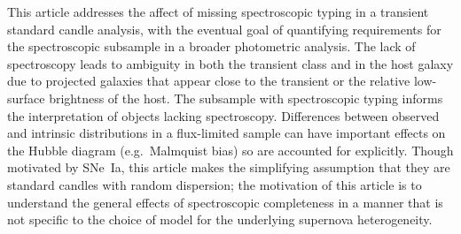 \documentclass[preprint,3p]{elsarticle}
\begin{document}
This article addresses the affect of missing spectroscopic typing in
a transient standard candle analysis, with the eventual goal of quantifying
requirements for the spectroscopic subsample in a broader photometric analysis.
The lack of spectroscopy leads to ambiguity in both the transient class and
in the host galaxy due to projected galaxies that appear close to the transient or
the relative low-surface brightness of the host.  The subsample with
spectroscopic typing informs the interpretation of objects lacking spectroscopy.
Differences between observed and
intrinsic distributions in a flux-limited sample can have important effects on the Hubble
diagram  (e.g.\ Malmquist bias) so are accounted for explicitly.
Though motivated by SNe~Ia, this article makes the simplifying assumption that they
are standard candles with random dispersion; the motivation of this article is to understand
the general effects of spectroscopic completeness in a manner that is not specific to
the choice of model for the underlying supernova heterogeneity.
\end{document}

